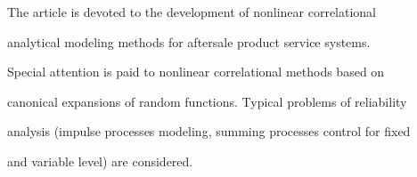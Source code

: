 \titele{\tit}{\aut}{\auf}{\leftkol}{\rightkol}





\vspace*{-8pt}








\noindent


The article is devoted to the development of nonlinear correlational 


analytical modeling methods for aftersale product service systems. 


Special attention is paid to nonlinear correlational methods based on 


canonical expansions of random functions. Typical problems of reliability 


analysis (impulse processes modeling, summing processes control for fixed 


and variable level) are considered.





\vspace*{-6pt}


     



















\def\leftkol{\ } %


\def\rightkol{\ } %








\def\tit{SOME APPROACHES TO~DEVELOPING THIN CLIENT TECHNOLOGIES FOR~SECURE INFORMATION SYSTEMS}





